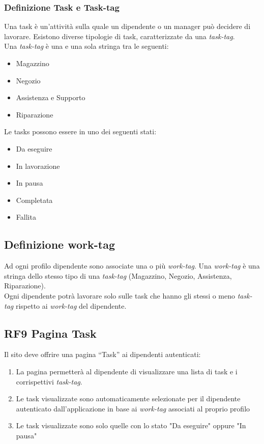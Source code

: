 \documentclass{report}
\begin{document}
\subsubsection*{Definizione Task e Task-tag}
Una task è un'attività sulla quale un dipendente o un manager può decidere di lavorare. Esistono diverse tipologie di task, caratterizzate da una \textit{task-tag}. \\
Una \textit{task-tag} è una e una sola stringa tra le seguenti:
\begin{itemize}
	\item Magazzino
	\item Negozio
	\item Assistenza e Supporto
	\item Riparazione
\end{itemize}
Le tasks possono essere in uno dei seguenti stati: 
\begin{itemize}
	\item Da eseguire
	\item In lavorazione
	\item In pausa
	\item Completata
	\item Fallita
\end{itemize}

\subsection*{Definizione work-tag}
Ad ogni profilo dipendente sono associate una o più \textit{work-tag}. Una \textit{work-tag} è una stringa dello stesso tipo di una \textit{task-tag} (Magazzino, Negozio, Assistenza, Riparazione).\\
Ogni dipendente potrà lavorare solo sulle task che hanno gli stessi o meno \textit{task-tag} rispetto ai \textit{work-tag} del dipendente.


\subsection*{RF9 Pagina Task}

Il sito deve offrire una pagina “Task” ai dipendenti autenticati:

\begin{enumerate}
	\item La pagina permetterà al dipendente di visualizzare una lista di task e i corrispettivi \textit{task-tag}.
	
	\item Le task visualizzate sono automaticamente selezionate per il dipendente autenticato dall’applicazione in base ai \textit{work-tag} associati al proprio profilo
	
	\item Le task visualizzate sono solo quelle con lo stato "Da eseguire" oppure "In pausa"

	
\end{enumerate}
\end{document}
